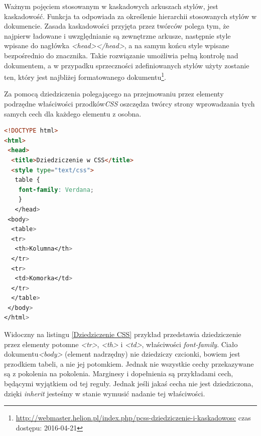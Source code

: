 \documentclass{iiuwb}
\begin{document}
Ważnym pojęciem stosowanym w kaskadowych arkuszach stylów, jest kaskadowość. Funkcja ta odpowiada za określenie hierarchii stosowanych stylów w dokumencie. Zasada kaskadowości przyjęta przez twórców polega tym, że najpierw ładowane i uwzględnianie są zewnętrzne arkusze, następnie style wpisane do nagłówka \textit{<head></head>}, a na samym końcu style wpisane bezpośrednio do znacznika. Takie rozwiązanie umożliwia pełną kontrolę nad dokumentem, a w przypadku sprzeczności zdefiniowanych stylów użyty zostanie ten, który jest najbliżej formatowanego dokumentu\footnote{\url{http://webmaster.helion.pl/index.php/pcss-dziedziczenie-i-kaskadowosc} czas dostępu: 2016-04-21}.

Za pomocą dziedziczenia polegającego na przejmowaniu przez elementy podrzędne właściwości przodków\textit{CSS} oszczędza twórcy strony wprowadzania tych samych cech dla każdego elementu z osobna. 
\begin{lstlisting}[language=HTML, label=Dziedziczenie CSS, caption=Dziedziczenie w CSS]
<!DOCTYPE html>
<html>
 <head>
  <title>Dziedziczenie w CSS</title>
  <style type="text/css">
   table {
    font-family: Verdana;
    }
   </head>
 <body>
  <table>
  <tr>
   <th>Kolumna</th>  
  </tr>
  <tr>
   <td>Komorka</td>
  </tr>  
  </table> 
 </body>
</html>
\end{lstlisting} 
Widoczny na listingu \ref{Dziedziczenie CSS} przykład przedstawia dziedziczenie przez elementy potomne \textit{<tr>}, \textit{<th>} i \textit{<td>}, właściwości \textit{font-family}. Ciało dokumentu\textit{<body>} (element nadrzędny) nie dziedziczy czcionki, bowiem jest przodkiem tabeli, a nie jej potomkiem. Jednak nie wszystkie cechy przekazywane są z pokolenia na pokolenia. Marginesy i dopełnienia są przykładami cech, będącymi wyjątkiem od tej reguły. Jednak jeśli jakaś cecha nie jest dziedziczona, dzięki \textit{inherit} jesteśmy w stanie wymusić nadanie tej właściwości. 
\end{document}
